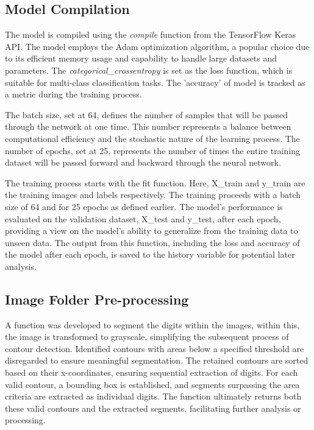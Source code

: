 \subsection{Model Compilation}
The model is compiled using the \textit{compile} function from the TensorFlow Keras API. The model employs the Adam optimization algorithm, a popular choice due to its efficient memory usage and capability to handle large datasets and parameters. The \textit{categorical\_crossentropy} is set as the loss function, which is suitable for multi-class classification tasks. The 'accuracy' of model is tracked as a metric during the training process.



The batch size, set at 64, defines the number of samples that will be passed through the network at one time. This number represents a balance between computational efficiency and the stochastic nature of the learning process. The number of epochs, set at 25, represents the number of times the entire training dataset will be passed forward and backward through the neural network.

The training process starts with the fit function. Here, X\_train and y\_train are the training images and labels respectively. The training proceeds with a batch size of 64 and for 25 epochs as defined earlier. The model's performance is evaluated on the validation dataset, X\_test and y\_test, after each epoch, providing a view on the model's ability to generalize from the training data to unseen data. The output from this function, including the loss and accuracy of the model after each epoch, is saved to the history variable for potential later analysis.

\subsection{Image Folder Pre-processing}

A function was developed to segment the digits within the images, within this, the image is transformed to grayscale, simplifying the subsequent process of contour detection. Identified contours with areas below a specified threshold are disregarded to ensure meaningful segmentation. The retained contours are sorted based on their x-coordinates, ensuring sequential extraction of digits. For each valid contour, a bounding box is established, and segments surpassing the area criteria are extracted as individual digits. The function ultimately returns both these valid contours and the extracted segments, facilitating further analysis or processing.

